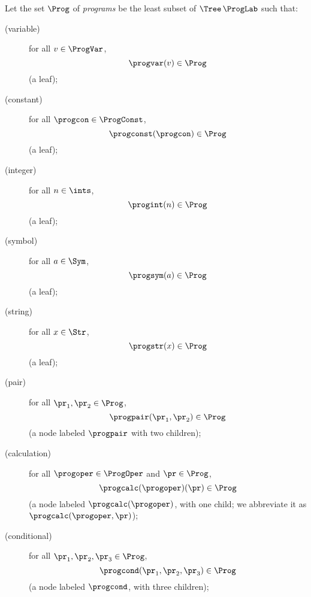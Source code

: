 Let the set $\Prog$ of \emph{programs} be the least subset
of $\Tree\,\ProgLab$ such that:
\begin{description}
\item[\quad(variable)] for all $v\in\ProgVar$,
  \begin{displaymath}
    \progvar(v)\in\Prog
  \end{displaymath}
  (a leaf);

\item[\quad(constant)] for all $\progcon\in\ProgConst$,
  \begin{displaymath}
   \progconst(\progcon)\in\Prog 
  \end{displaymath}
  (a leaf);

\item[\quad(integer)] for all $n\in\ints$, 
  \begin{displaymath}
    \progint(n)\in\Prog
  \end{displaymath}
  (a leaf);

\item[\quad(symbol)] for all $a\in\Sym$,
  \begin{displaymath}
    \progsym(a)\in\Prog
  \end{displaymath}
  (a leaf);

\item[\quad(string)] for all $x\in\Str$,
  \begin{displaymath}
    \progstr(x)\in\Prog    
  \end{displaymath}
  (a leaf);

\item[\quad(pair)] for all $\pr_1,\pr_2\in\Prog$,
  \begin{displaymath}
   \progpair(\pr_1,\pr_2)\in\Prog 
  \end{displaymath}
  (a node labeled $\progpair$ with two children);

\item[\quad(calculation)] for all $\progoper\in\ProgOper$ and
  $\pr\in\Prog$,
  \begin{displaymath}
    \progcalc(\progoper)(\pr)\in\Prog    
  \end{displaymath}
  (a node labeled $\progcalc(\progoper)$, with one child; we abbreviate it as
  $\progcalc(\progoper,\pr)$);

\item[\quad(conditional)] for all $\pr_1,\pr_2,\pr_3\in\Prog$,
  \begin{displaymath}
   \progcond(\pr_1,\pr_2,\pr_3)\in\Prog 
  \end{displaymath}
  (a node labeled $\progcond$, with three children);


\end{description}
